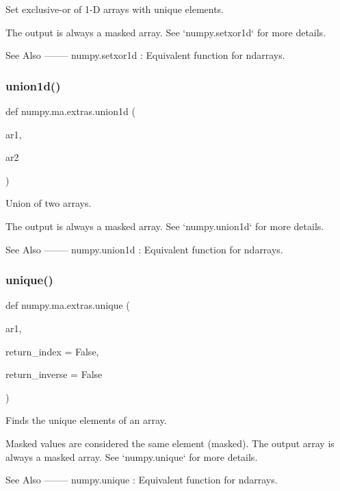 \begin{DoxyVerb}Set exclusive-or of 1-D arrays with unique elements.

The output is always a masked array. See `numpy.setxor1d` for more details.

See Also
--------
numpy.setxor1d : Equivalent function for ndarrays.\end{DoxyVerb}
 \mbox{\label{namespacenumpy_1_1ma_1_1extras_a70dfeb45369189c266e0af67cf768f15}} 
\subsubsection{\texorpdfstring{union1d()}{union1d()}}
{\footnotesize\ttfamily def numpy.\+ma.\+extras.\+union1d (\begin{DoxyParamCaption}\item[{}]{ar1,  }\item[{}]{ar2 }\end{DoxyParamCaption})}

\begin{DoxyVerb}Union of two arrays.

The output is always a masked array. See `numpy.union1d` for more details.

See Also
--------
numpy.union1d : Equivalent function for ndarrays.\end{DoxyVerb}
 \mbox{\label{namespacenumpy_1_1ma_1_1extras_a79ba274ef219d38625f48f5fc490ec7c}} 
\subsubsection{\texorpdfstring{unique()}{unique()}}
{\footnotesize\ttfamily def numpy.\+ma.\+extras.\+unique (\begin{DoxyParamCaption}\item[{}]{ar1,  }\item[{}]{return\+\_\+index = {\ttfamily False},  }\item[{}]{return\+\_\+inverse = {\ttfamily False} }\end{DoxyParamCaption})}

\begin{DoxyVerb}Finds the unique elements of an array.

Masked values are considered the same element (masked). The output array
is always a masked array. See `numpy.unique` for more details.

See Also
--------
numpy.unique : Equivalent function for ndarrays.\end{DoxyVerb}
 \mbox{\label{namespacenumpy_1_1ma_1_1extras_a83f58345cd4c9d4411b20da8cf118c32}} 
